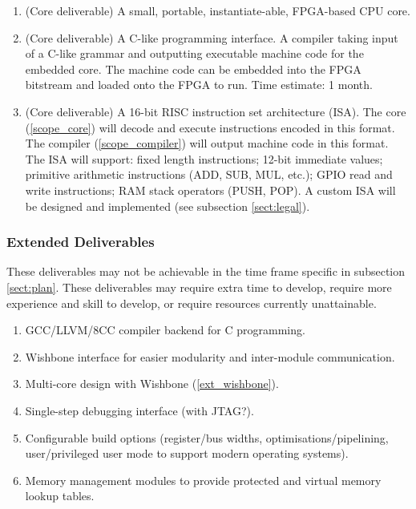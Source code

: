\begin{enumerate}
\item{(Core deliverable) A small, portable, instantiate-able, FPGA-based CPU core.}\label{scope_core}

\item{(Core deliverable) A C-like programming interface. A compiler taking input of a C-like grammar and outputting executable machine code for the embedded core. The machine code can be embedded into the FPGA bitstream and loaded onto the FPGA to run. Time estimate: 1 month.}\label{scope_compiler}

\item{(Core deliverable) A 16-bit RISC instruction set architecture (ISA). The core (\ref{scope_core}) will decode and execute instructions encoded in this format. The compiler (\ref{scope_compiler}) will output machine code in this format. The ISA will support: fixed length instructions; 12-bit immediate values; primitive arithmetic instructions (ADD, SUB, MUL, etc.); GPIO read and write instructions; RAM stack operators (PUSH, POP). A custom ISA will be designed and implemented (see subsection \ref{sect:legal}).
}
\end{enumerate}


\subsubsection*{Extended Deliverables}
These deliverables may not be achievable in the time frame specific in subsection \ref{sect:plan}. These deliverables may require extra time to develop, require more experience and skill to develop, or require resources currently unattainable.

\begin{enumerate}
\item{GCC/LLVM/8CC compiler backend for C programming.}
\item{Wishbone interface for easier modularity and inter-module communication.}\label{ext_wishbone}
\item{Multi-core design with Wishbone (\ref{ext_wishbone}).}
\item{Single-step debugging interface (with JTAG?).}
\item{Configurable build options (register/bus widths, optimisations/pipelining, user/privileged user mode to support modern operating systems).}
\item{Memory management modules to provide protected and virtual memory lookup tables.}
\end{enumerate}

